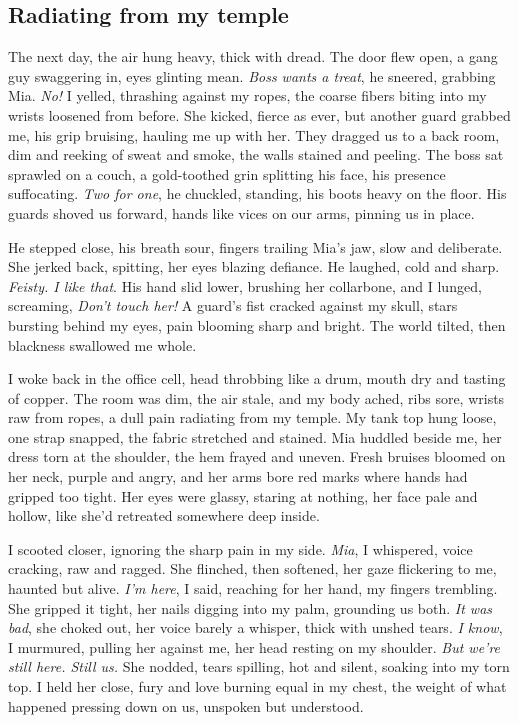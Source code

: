 \documentclass[12pt,oneside]{book}
\begin{document}
\subsection*{Radiating from my temple}

The next day, the air hung heavy, thick with dread. The door flew open, a gang guy swaggering in, eyes glinting mean. \textit{Boss wants a treat}, he sneered, grabbing Mia. \textit{No!} I yelled, thrashing against my ropes, the coarse fibers biting into my wrists loosened from before. She kicked, fierce as ever, but another guard grabbed me, his grip bruising, hauling me up with her. They dragged us to a back room, dim and reeking of sweat and smoke, the walls stained and peeling. The boss sat sprawled on a couch, a gold-toothed grin splitting his face, his presence suffocating. \textit{Two for one}, he chuckled, standing, his boots heavy on the floor. His guards shoved us forward, hands like vices on our arms, pinning us in place.

He stepped close, his breath sour, fingers trailing Mia’s jaw, slow and deliberate. She jerked back, spitting, her eyes blazing defiance. He laughed, cold and sharp. \textit{Feisty. I like that}. His hand slid lower, brushing her collarbone, and I lunged, screaming, \textit{Don’t touch her!} A guard’s fist cracked against my skull, stars bursting behind my eyes, pain blooming sharp and bright. The world tilted, then blackness swallowed me whole.

I woke back in the office cell, head throbbing like a drum, mouth dry and tasting of copper. The room was dim, the air stale, and my body ached, ribs sore, wrists raw from ropes, a dull pain radiating from my temple. My tank top hung loose, one strap snapped, the fabric stretched and stained. Mia huddled beside me, her dress torn at the shoulder, the hem frayed and uneven. Fresh bruises bloomed on her neck, purple and angry, and her arms bore red marks where hands had gripped too tight. Her eyes were glassy, staring at nothing, her face pale and hollow, like she’d retreated somewhere deep inside.

I scooted closer, ignoring the sharp pain in my side. \textit{Mia}, I whispered, voice cracking, raw and ragged. She flinched, then softened, her gaze flickering to me, haunted but alive. \textit{I’m here}, I said, reaching for her hand, my fingers trembling. She gripped it tight, her nails digging into my palm, grounding us both. \textit{It was bad}, she choked out, her voice barely a whisper, thick with unshed tears. \textit{I know}, I murmured, pulling her against me, her head resting on my shoulder. \textit{But we’re still here. Still us.} She nodded, tears spilling, hot and silent, soaking into my torn top. I held her close, fury and love burning equal in my chest, the weight of what happened pressing down on us, unspoken but understood.
\end{document}
